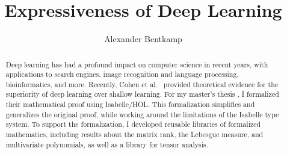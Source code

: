 \documentclass[11pt,a4paper]{article}
\begin{document}
\title{Expressiveness of Deep Learning}
\author{Alexander Bentkamp}
\maketitle

\begin{abstract}
Deep learning has had a profound impact on computer science in recent years, with applications to search engines, image recognition and language processing, bioinformatics, and more. Recently, Cohen et al.\ \cite{cohen2015} provided theoretical evidence for the superiority of deep learning over shallow learning. For my master's thesis \cite{bentkamp2016}, I formalized their mathematical proof using Isabelle/HOL. This formalization simplifies and generalizes the original proof, while working around the limitations of the Isabelle type system. To support the formalization, I developed reusable libraries of formalized mathematics, including results about the matrix rank, the Lebesgue measure, and multivariate polynomials, as well as a library for tensor analysis. 
\end{abstract}

\tableofcontents





\end{document}
